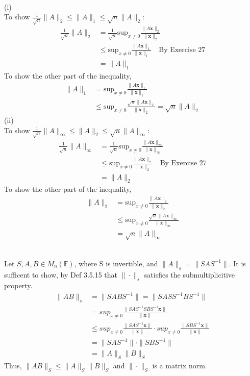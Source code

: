 \documentclass[letterpaper,12pt]{article}
\theoremstyle{definition}
\begin{document}
\\
(i)\\
To show 
$\frac{1}{\sqrt{n}}\|A\|_2 \leq \|A\|_1 \leq \sqrt{n} \|A\|_2$: \\
\begin{align*}
    \frac{1}{\sqrt{n}}\|A\|_2 & = \frac{1}{\sqrt{n}} \text{sup}_{x \neq 0} \frac{\|A \mathbf{x}\|_2 }{\|\mathbf{x}\|_2} \\
    & \leq  \text{sup}_{x \neq 0} \frac{\|A \mathbf{x}\|_1 }{\|\mathbf{x}\|_1} \quad \text{By Exercise 27}\\
    & = \|A\|_1
\end{align*}
To show the other part of the inequality, 
\begin{align*}
    \|A\|_1 &= \text{sup}_{x \neq 0} \frac{\|A \mathbf{x}\|_1 }{\|\mathbf{x}\|_1} \\
    & \leq \text{sup}_{x \neq 0} \frac{\sqrt{n} \|A \mathbf{x}\|_2 }{\|\mathbf{x}\|_2}  = \sqrt{n} \|A\|_2
\end{align*}
(ii)\\
To show $\frac{1}{\sqrt{n}} \|A\|_{\infty} \leq \|A\|_2 \leq \sqrt{n} \|A\|_{\infty}$:\\
\begin{align*}
    \frac{1}{\sqrt{n}}\|A\|_{\infty} & = \frac{1}{\sqrt{n}} \text{sup}_{x \neq 0} \frac{\|A \mathbf{x}\|_{\infty} }{\|\mathbf{x}\|_{\infty}} \\
    & \leq  \text{sup}_{x \neq 0} \frac{\|A \mathbf{x}\|_2 }{\|\mathbf{x}\|_2} \quad \text{By Exercise 27}\\
    & = \|A\|_2
\end{align*}
To show the other part of the inequality, 
\begin{align*}
    \|A\|_2 &= \text{sup}_{x \neq 0} \frac{\|A \mathbf{x}\|_2 }{\|\mathbf{x}\|_2} \\
    & \leq \text{sup}_{x \neq 0} \frac{\sqrt{n} \|A \mathbf{x}\|_{\infty} }{\|\mathbf{x}\|_{\infty}}\\
    & = \sqrt{n} \|A\|_{\infty}
\end{align*}


\\
Let $S,A,B \in M_n(\mathbb{F})$, where S is invertible, and $\|A\|_s = \|SAS^{-1}\|$. It is sufficent to show, by Def 3.5.15 that $\|\cdot\|_s$ satisfies the submultiplicitive property.
\begin{align*}
    \|AB\|_s & = \|SABS^{-1}\| = \|SASS^{-1}BS^{-1}\| \\
    & = sup_{x \neq 0} \frac{\|SAS^{-1}SBS^{-1}\mathbf{x}\|}{\|\mathbf{x}\|} \\
    & \leq sup_{x \neq 0} \frac{\|SAS^{-1}\mathbf{x}\|}{\|\mathbf{x}\|} \cdot sup_{x \neq 0} \frac{\|SBS^{-1}\mathbf{x}\|}{\|\mathbf{x}\|} \\
    & = \|SAS^{-1}\| \cdot \|SBS^{-1}\|\\
    & = \|A\|_S \|B\|_S
\end{align*}
Thus, $\|AB\|_S \leq \|A\|_S\|B\|_S$ and $\|\cdot\|_S$ is a matrix norm.
\end{document}
